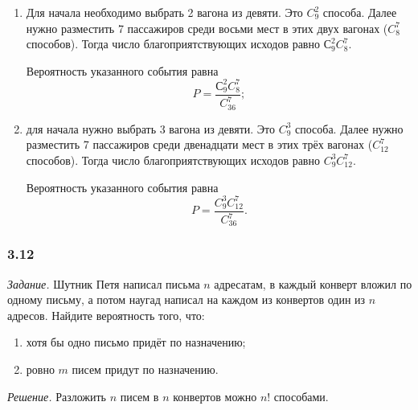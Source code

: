\begin{enumerate}[label=\alph*)]
\item Для начала необходимо выбрать 2 вагона из девяти.
Это $C_9^2$ способа.
Далее нужно разместить 7 пассажиров среди восьми мест в этих двух вагонах ($C_{8}^7$ способов).
Тогда число благоприятствующих исходов равно $С_9^2 C_8^7$.

Вероятность указанного события равна
$$P =
\frac{С_9^2 C_8^7}{C_{36}^7};$$

\item для начала нужно выбрать 3 вагона из девяти.
Это $C_9^3$ способа.
Далее нужно разместить 7 пассажиров среди двенадцати мест в этих трёх вагонах ($C_{12}^7$ способов).
Тогда число благоприятствующих исходов равно $C_9^3 C_{12}^7$.

Вероятность указанного события равна
$$P =
\frac{C_9^3 C_{12}^7}{C_{36}^7}.$$
\end{enumerate}

\subsubsection*{3.12}

\textit{Задание.} Шутник Петя написал письма $n$ адресатам, в каждый конверт вложил по одному письму, а потом наугад написал на каждом из конвертов один из $n$ адресов.
Найдите вероятность того, что:
\begin{enumerate}[label=\alph*)]
\item хотя бы одно письмо придёт по назначению;
\item ровно $m$ писем придут по назначению.
\end{enumerate}

\textit{Решение.} Разложить $n$ писем в $n$ конвертов можно $n!$ способами.

